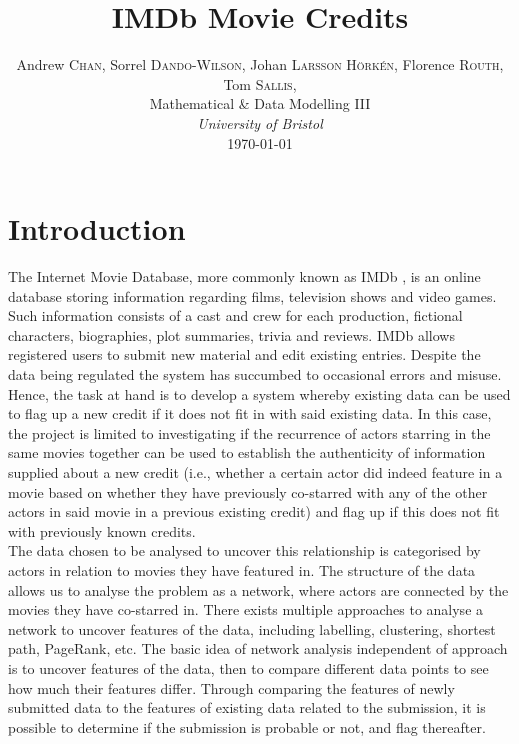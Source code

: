 \documentclass[12pt]{ieeeconf}      %
\title{\LARGE \bf
IMDb Movie Credits
}
\author{Andrew \textsc{Chan}, Sorrel \textsc{Dando-Wilson}, Johan \textsc{Larsson H\"ork\'en}, Florence \textsc{Routh},\\ Tom \textsc{Sallis}, \\Mathematical \& Data Modelling III\\
\textit{University of Bristol}\\
\today%
}
\begin{document}

\maketitle


\section{Introduction}
\indent The Internet Movie Database, more commonly known as IMDb \cite{imdb}, is an online database storing information regarding films, television shows and video games. Such information consists of a cast and crew for each production, fictional characters, biographies, plot summaries, trivia and reviews. IMDb allows registered users to submit new material and edit existing entries. Despite the data being regulated the system has succumbed to occasional errors and misuse. Hence, the task at hand is to develop a system whereby existing data can be used to flag up a new credit if it does not fit in with said existing data. In this case, the project is limited to investigating if the recurrence of actors starring in the same movies together can be used to establish the authenticity of information supplied about a new credit (i.e., whether a certain actor did indeed feature in a movie based on whether they have previously co-starred with any of the other actors in said movie in a previous existing credit) and flag up if this does not fit with previously known credits. 
\\
\indent The data chosen to be analysed to uncover this relationship is categorised by actors in relation to movies they have featured in. The structure of the data allows us to analyse the problem as a network, where actors are connected by the movies they have co-starred in. There exists multiple approaches to analyse a network to uncover features of the data, including labelling, clustering, shortest path, PageRank, etc. The basic idea of network analysis independent of approach is to uncover features of the data, then to compare different data points to see how much their features differ. Through comparing the features of newly submitted data to the features of existing data related to the submission, it is possible to determine if the submission is probable or not, and flag thereafter.
\end{document}
